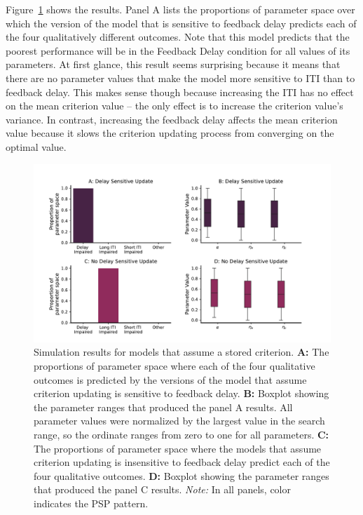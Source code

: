 \documentclass[doc, floatsintext]{apa7}
\begin{document}
Figure~\ref{fig:criterion_results} shows the results. Panel
A lists the proportions of parameter space over which the
version of the model that is sensitive to feedback delay
predicts each of the four qualitatively different outcomes.
Note that this model predicts that the poorest performance
will be in the Feedback Delay condition for all values of
its parameters. At first glance, this result seems
surprising because it means that there are no parameter
values that make the model more sensitive to ITI than to
feedback delay. This makes sense though because increasing
the ITI has no effect on the mean criterion value -- the
only effect is to increase the criterion value's variance.
In contrast, increasing the feedback delay affects the mean
criterion value because it slows the criterion updating
process from converging on the optimal value. 

\begin{figure} 
  \centering
  \includegraphics[width=1\textwidth]{../figures/model_new_class_II_yes_stored_criterion.pdf}
  \caption{Simulation results for models that assume a stored criterion.  
      \textbf{A:} The proportions of parameter space where
      each of the four qualitative outcomes is predicted by
      the versions of the model that assume criterion
      updating is sensitive to feedback delay. 
      \textbf{B:} Boxplot showing the parameter ranges that
      produced the panel A results. All parameter values
      were normalized by the largest value in the search
      range, so the ordinate ranges from zero to one for all
      parameters.
      \textbf{C:} The proportions of parameter space where
      the models that assume criterion updating is
      insensitive to feedback delay predict each of the four
      qualitative outcomes. 
      \textbf{D:} Boxplot showing the parameter ranges that
      produced the panel C results.     
      \textit{Note:} In all panels, color indicates the PSP
      pattern.
}
    \label{fig:criterion_results}
\end{figure}
\end{document}
